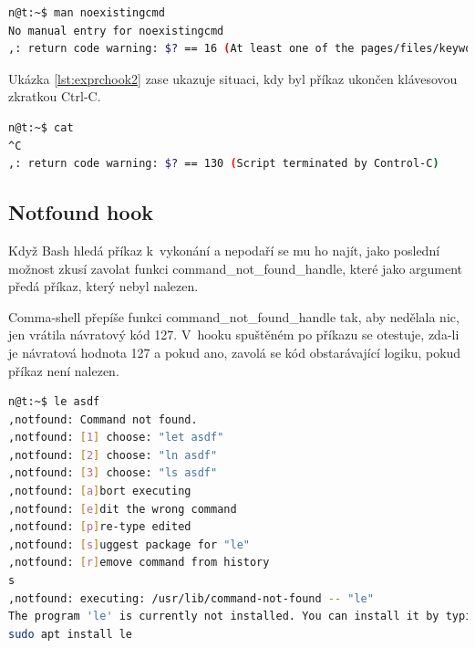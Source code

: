 \documentclass[thesis=M,czech]{FITthesis}[2012/06/26]
\begin{document}
\noindent
\begin{minipage}{\linewidth}
\begin{lstlisting}[language=bash, caption={Explain RC hook}, label={lst:exprchook}]
n@t:~$ man noexistingcmd
No manual entry for noexistingcmd
,: return code warning: $? == 16 (At least one of the pages/files/keywords didn't exist or wasn't matched.)
\end{lstlisting}
\end{minipage}

Ukázka \ref{lst:exprchook2} zase ukazuje situaci, kdy byl příkaz ukončen klávesovou zkratkou Ctrl-C.

\noindent
\begin{minipage}{\linewidth}
\begin{lstlisting}[language=bash, caption={Explain RC hook}, label={lst:exprchook2}]
n@t:~$ cat
^C
,: return code warning: $? == 130 (Script terminated by Control-C)
\end{lstlisting}
\end{minipage}


\subsection{Notfound hook}

Když Bash hledá příkaz k~vykonání a nepodaří se mu ho najít, jako poslední možnost zkusí zavolat funkci command\_not\_found\_handle, které jako argument předá příkaz, který nebyl nalezen.

Comma-shell přepíše funkci command\_not\_found\_handle tak, aby nedělala nic, jen vrátila návratový kód 127. V~hooku spuštěném po příkazu se otestuje, zda-li je návratová hodnota 127 a pokud ano, zavolá se kód obstarávající logiku, pokud příkaz není nalezen.

\noindent
\begin{minipage}{\linewidth}
\begin{lstlisting}[language=bash, caption={Explain RC hook}, label={lst:notfoundhook}]
n@t:~$ le asdf
,notfound: Command not found.
,notfound: [1] choose: "let asdf"
,notfound: [2] choose: "ln asdf"
,notfound: [3] choose: "ls asdf"
,notfound: [a]bort executing
,notfound: [e]dit the wrong command
,notfound: [p]re-type edited
,notfound: [s]uggest package for "le"
,notfound: [r]emove command from history
s
,notfound: executing: /usr/lib/command-not-found -- "le"
The program 'le' is currently not installed. You can install it by typing:
sudo apt install le
\end{lstlisting}
\end{minipage}
\end{document}
